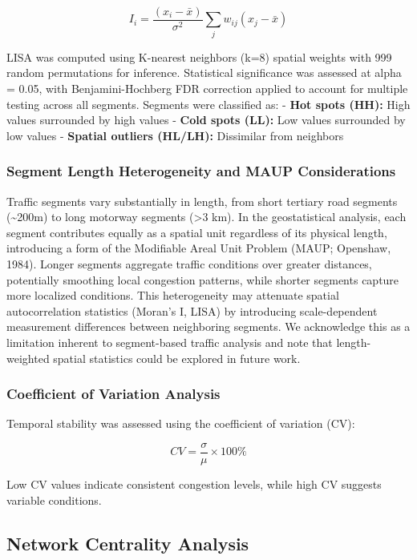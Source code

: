 \documentclass[12pt,a4paper]{article}
\begin{document}
\[I_i = \frac{(x_i - \bar{x})}{\sigma^2} \sum_j w_{ij}(x_j - \bar{x})\]

LISA was computed using K-nearest neighbors (k=8) spatial weights with 999 random permutations for inference. Statistical significance was assessed at alpha = 0.05, with Benjamini-Hochberg FDR correction applied to account for multiple testing across all segments. Segments were classified as: - \textbf{Hot spots (HH):} High values surrounded by high values - \textbf{Cold spots (LL):} Low values surrounded by low values - \textbf{Spatial outliers (HL/LH):} Dissimilar from neighbors

\subsubsection{Segment Length Heterogeneity and MAUP Considerations}

Traffic segments vary substantially in length, from short tertiary road segments (\textasciitilde200m) to long motorway segments (>3 km). In the geostatistical analysis, each segment contributes equally as a spatial unit regardless of its physical length, introducing a form of the Modifiable Areal Unit Problem (MAUP; Openshaw, 1984). Longer segments aggregate traffic conditions over greater distances, potentially smoothing local congestion patterns, while shorter segments capture more localized conditions. This heterogeneity may attenuate spatial autocorrelation statistics (Moran's I, LISA) by introducing scale-dependent measurement differences between neighboring segments. We acknowledge this as a limitation inherent to segment-based traffic analysis and note that length-weighted spatial statistics could be explored in future work.

\subsubsection{Coefficient of Variation Analysis}

Temporal stability was assessed using the coefficient of variation (CV):

\[CV = \frac{\sigma}{\mu} \times 100\%\]

Low CV values indicate consistent congestion levels, while high CV suggests variable conditions.

\subsection{Network Centrality Analysis}
\end{document}
